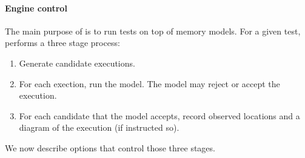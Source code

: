 \paragraph{Engine control}
The main purpose of \herd{} is to run tests on top of memory models.
For a given test, \herd{} performs a three stage process:
\begin{enumerate}
\item Generate candidate executions.
\item For each exection, run the model. The model may reject or accept
the execution.
\item For each candidate that the model accepts, record observed locations
and a diagram of the execution (if instructed so).
\end{enumerate}
We now describe options that control those three stages.

